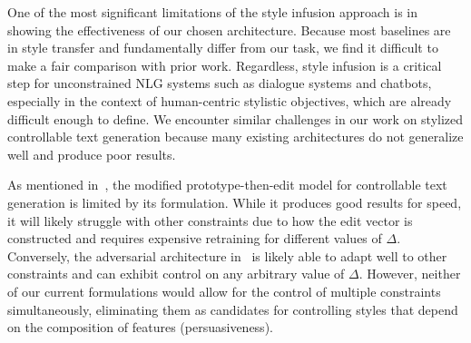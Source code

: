 One of the most significant limitations of the style infusion approach is in showing the effectiveness of our chosen architecture. Because most baselines are in style transfer and fundamentally differ from our task, we find it difficult to make a fair comparison with prior work. Regardless, style infusion is a critical step for unconstrained NLG systems such as dialogue systems and chatbots, especially in the context of human-centric stylistic objectives, which are already difficult enough to define. We encounter similar challenges in our work on stylized controllable text generation because many existing architectures do not generalize well and produce poor results. 

As mentioned in~, the modified prototype-then-edit model for controllable text generation is limited by its formulation. While it produces good results for speed, it will likely struggle with other constraints due to how the edit vector is constructed and requires expensive retraining for different values of $\Delta$. Conversely, the adversarial architecture in~ is likely able to adapt well to other constraints and can exhibit control on any arbitrary value of $\Delta$. However, neither of our current formulations would allow for the control of multiple constraints simultaneously, eliminating them as candidates for controlling styles that depend on the composition of features (\eg persuasiveness). 




